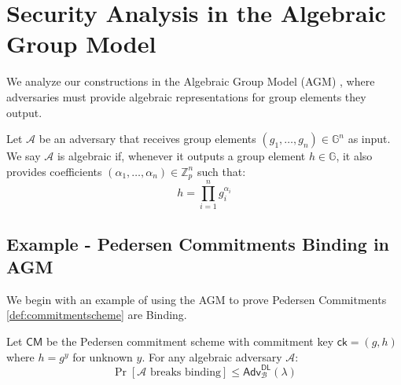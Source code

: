 \section{Security Analysis in the Algebraic Group Model}
\label{sec:agm-analysis}

We analyze our constructions in the Algebraic Group Model (AGM) \cite{shacham_algebraic_2018, hanaoka_pairing-free_2022}, where adversaries must provide algebraic representations for group elements they output.

\begin{definition}
Let $\mathcal{A}$ be an adversary that receives group elements $(g_1, \ldots, g_n) \in \mathbb{G}^n$ 
as input. We say $\mathcal{A}$ is algebraic if, whenever it outputs a group element $h \in \mathbb{G}$, 
it also provides coefficients $(\alpha_1, \ldots, \alpha_n) \in \mathbb{Z}_p^n$ such that:
$$h = \prod_{i=1}^n g_i^{\alpha_i}$$
\end{definition}





\subsection{Example - Pedersen Commitments Binding in AGM}
We begin with an example of using the AGM to prove Pedersen Commitments \ref{def:commitmentscheme} are Binding. 


\begin{theorem}
Let $\mathsf{CM}$ be the Pedersen commitment scheme with commitment key $\mathsf{ck} = (g, h)$ where $h = g^y$ for unknown $y$. For any algebraic adversary $\mathcal{A}$:
$$\Pr[\mathcal{A} \text{ breaks binding}] \leq \mathsf{Adv}^{\mathsf{DL}}_{\mathcal{B}}(\lambda)$$
\end{theorem}

